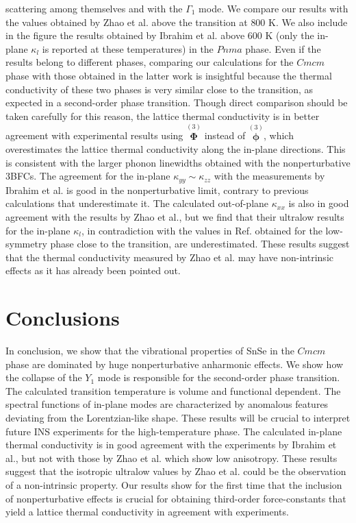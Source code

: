 scattering among themselves and with the $\Gamma_1$ mode. We compare our results with the values obtained by Zhao et al.\cite{zhao2014ultralow} above the transition at $800$ K. We also include in the figure the results 
obtained by Ibrahim et al.\cite{ibrahim2017reinvestigation} above $600$ K (only the in-plane $\kappa_l$ is reported at these temperatures) in the $Pnma$ phase. Even if the results belong to different phases, comparing our 
calculations for the $Cmcm$ phase with those obtained in the latter work is insightful because the thermal conductivity of these two phases is very similar close to the transition, as expected in a second-order phase 
transition. Though direct comparison should be taken carefully for this reason, the lattice thermal conductivity is in better agreement with experimental results using $\overset{(3)}{\boldsymbol{\Phi}}$ instead 
of $\overset{(3)}{\boldsymbol{\phi}}$, which overestimates the lattice thermal conductivity along the in-plane directions. This is consistent with the larger phonon linewidths obtained with the nonperturbative 3BFCs. The 
agreement for the in-plane $\kappa_{yy} \sim \kappa_{zz}$ with the measurements by Ibrahim et al.\cite{ibrahim2017reinvestigation} is good in the nonperturbative limit, contrary to previous calculations that 
underestimate it\cite{skelton2016anharmonicity}. The calculated out-of-plane $\kappa_{xx}$ is also in good agreement with the results by Zhao et al.\cite{zhao2014ultralow}, but we find that their ultralow results for the 
in-plane $\kappa_l$, in contradiction with the values in Ref. \cite{ibrahim2017reinvestigation} obtained for the low-symmetry phase close to the transition, are underestimated. These results suggest that the thermal 
conductivity measured by Zhao et al. may have non-intrinsic effects as it has already been pointed out\cite{wei2016intrinsic}.

\section{Conclusions}

In conclusion, we show that the vibrational properties of SnSe in the $Cmcm$ phase are dominated by huge nonperturbative anharmonic effects. We show how the collapse of the $Y_1$ mode is responsible for the second-order 
phase transition. The calculated transition temperature is volume and functional dependent. The spectral functions of in-plane modes are characterized by anomalous features deviating from the Lorentzian-like shape. These 
results will be crucial to interpret future INS experiments for the high-temperature phase. The calculated in-plane thermal conductivity is in good agreement with the experiments by Ibrahim et 
al.\cite{ibrahim2017reinvestigation}, but not with those by Zhao et al.\cite{zhao2014ultralow} which show low anisotropy. These results suggest that the isotropic ultralow values by Zhao et al. could be the observation of a 
non-intrinsic property. Our results show for the first time that the inclusion of nonperturbative effects is crucial for obtaining third-order force-constants that yield a lattice thermal conductivity in agreement with experiments.

